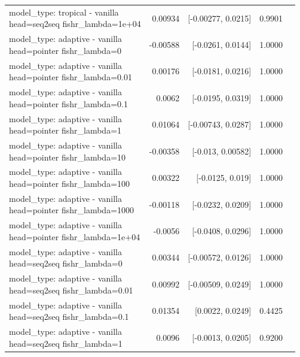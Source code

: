 \documentclass[10pt]{article}
\makeatletter
\newcommand{\stackcell}[1]{\begin{tabular}[t]{@{}l@{}}#1\end{tabular}}
\makeatother
\begin{document}
{\begin{longtable}{lrrrl}
\stackcell{model\_type: tropical - vanilla\\\footnotesize head=seq2seq fishr\_lambda=1e+04 } & 0.00934 & [-0.00277, 0.0215] & 0.9901 & \\
\stackcell{model\_type: adaptive - vanilla\\\footnotesize head=pointer fishr\_lambda=0 } & -0.00588 & [-0.0261, 0.0144] & 1.0000 & \\
\stackcell{model\_type: adaptive - vanilla\\\footnotesize head=pointer fishr\_lambda=0.01 } & 0.00176 & [-0.0181, 0.0216] & 1.0000 & \\
\stackcell{model\_type: adaptive - vanilla\\\footnotesize head=pointer fishr\_lambda=0.1 } & 0.0062 & [-0.0195, 0.0319] & 1.0000 & \\
\stackcell{model\_type: adaptive - vanilla\\\footnotesize head=pointer fishr\_lambda=1 } & 0.01064 & [-0.00743, 0.0287] & 1.0000 & \\
\stackcell{model\_type: adaptive - vanilla\\\footnotesize head=pointer fishr\_lambda=10 } & -0.00358 & [-0.013, 0.00582] & 1.0000 & \\
\stackcell{model\_type: adaptive - vanilla\\\footnotesize head=pointer fishr\_lambda=100 } & 0.00322 & [-0.0125, 0.019] & 1.0000 & \\
\stackcell{model\_type: adaptive - vanilla\\\footnotesize head=pointer fishr\_lambda=1000 } & -0.00118 & [-0.0232, 0.0209] & 1.0000 & \\
\stackcell{model\_type: adaptive - vanilla\\\footnotesize head=pointer fishr\_lambda=1e+04 } & -0.0056 & [-0.0408, 0.0296] & 1.0000 & \\
\stackcell{model\_type: adaptive - vanilla\\\footnotesize head=seq2seq fishr\_lambda=0 } & 0.00344 & [-0.00572, 0.0126] & 1.0000 & \\
\stackcell{model\_type: adaptive - vanilla\\\footnotesize head=seq2seq fishr\_lambda=0.01 } & 0.00992 & [-0.00509, 0.0249] & 1.0000 & \\
\stackcell{model\_type: adaptive - vanilla\\\footnotesize head=seq2seq fishr\_lambda=0.1 } & 0.01354 & [0.0022, 0.0249] & 0.4425 & \\
\stackcell{model\_type: adaptive - vanilla\\\footnotesize head=seq2seq fishr\_lambda=1 } & 0.0096 & [-0.0013, 0.0205] & 0.9200 & \\

\end{longtable}}
\end{document}
